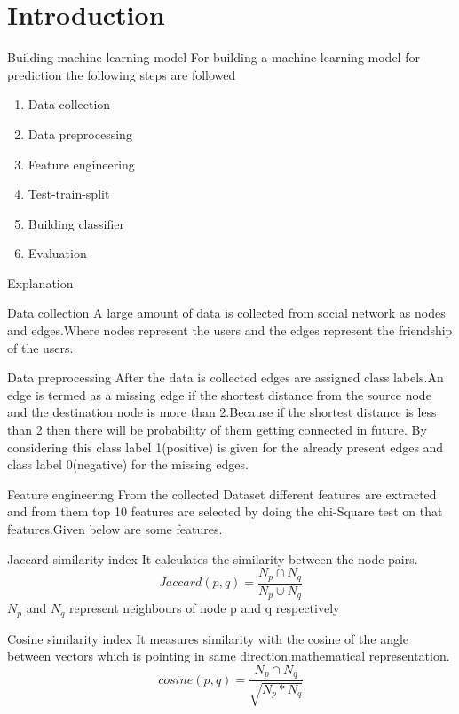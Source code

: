 \documentclass{beamer}
\begin{document}
\section{Introduction}
\begin{frame}{Building machine learning model}
For building a machine learning model for prediction the following steps are followed 
\begin{enumerate}
    \item Data collection
    \item Data preprocessing
    \item Feature engineering
    \item Test-train-split
    \item Building classifier
    \item Evaluation
\end{enumerate}
\end{frame}
\begin{frame}{Explanation}
\begin{block}{Data collection}
 A large amount of data is collected from social network as nodes and edges.Where nodes represent the users and the edges represent the friendship of the users.
\end{block}
\begin{block}{Data preprocessing}
 After the data is collected edges are assigned class labels.An edge is termed as a missing edge if the shortest distance from the source node and the destination node is more than 2.Because if the shortest distance is less than 2 then there will be probability of them getting connected in future. By considering this class label 1(positive) is given for the already present edges and class label 0(negative) for the missing edges.
\end{block}
\end{frame}
\begin{frame}{Feature engineering}
From the collected Dataset different features are extracted and from them top 10 features are selected by doing the chi-Square test on that features.Given below are some features.
\begin{block}{Jaccard similarity index}
It calculates the similarity between the node pairs.
$$Jaccard(p,q)=\frac{N_{p}\cap N_{q}}{N_{p}\cup N_{q}}$$
$N_{p}$ and $N_{q}$ represent neighbours of node p and q respectively
\end{block}
\begin{block}{Cosine similarity index}
It measures similarity with the cosine of the angle between vectors which is pointing in same direction.mathematical representation.
$$cosine(p,q)=\frac{N_{p}\cap N_{q}}{\sqrt{N_{p}*N_{q}}}$$
\end{block}
\end{frame}
\end{document}
